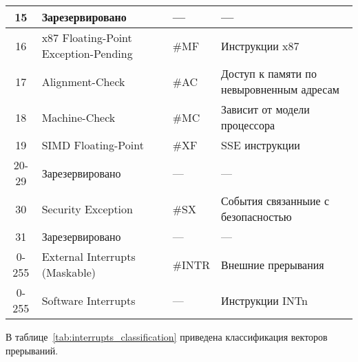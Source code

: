 \begin{center}
\begin{longtable}{|c|p{}|p{}|p{}|}
    \hline
    15  & Зарезервировано & --- & --- \\
    \hline
    16  & x87 Floating-Point Exception-Pending & \#MF & Инструкции x87 \\
    \hline
    17  & Alignment-Check & \#AC & Доступ к памяти по невыровненным адресам \\
    \hline
    18  & Machine-Check & \#MC & Зависит от модели процессора \\
    \hline
    19  & SIMD Floating-Point & \#XF & SSE инструкции \\
    \hline
    20-29  & Зарезервировано & --- & --- \\
    \hline
    30  & Security Exception & \#SX & События связанныие с безопасностью \\
    \hline
    31  & Зарезервировано & --- & --- \\
    \hline
    0-255  & External Interrupts (Maskable) & \#INTR & Внешние прерывания \\
    \hline
    0-255  & Software Interrupts & --- & Инструкции INTn \\
    \hline
  \end{longtable}
\end{center}

В таблице~\ref{tab:interrupts_classification} приведена классификация векторов
прерываний.

